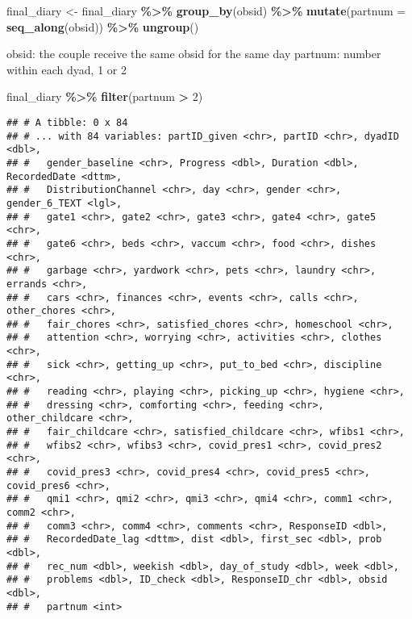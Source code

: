 \documentclass[
]{article}
\newenvironment{Shaded}{\begin{snugshade}}{\end{snugshade}}
\newcommand{\DataTypeTok}[1]{\textcolor[rgb]{0.13,0.29,0.53}{#1}}
\newcommand{\DecValTok}[1]{\textcolor[rgb]{0.00,0.00,0.81}{#1}}
\newcommand{\KeywordTok}[1]{\textcolor[rgb]{0.13,0.29,0.53}{\textbf{#1}}}
\newcommand{\NormalTok}[1]{#1}
\newcommand{\OperatorTok}[1]{\textcolor[rgb]{0.81,0.36,0.00}{\textbf{#1}}}
\newcommand{\StringTok}[1]{\textcolor[rgb]{0.31,0.60,0.02}{#1}}
\begin{document}
\begin{Shaded}
\begin{Highlighting}[]
\NormalTok{final\_diary \textless{}{-}}\StringTok{ }\NormalTok{final\_diary }\OperatorTok{\%\textgreater{}\%}
\StringTok{  }\KeywordTok{group\_by}\NormalTok{(obsid) }\OperatorTok{\%\textgreater{}\%}
\StringTok{  }\KeywordTok{mutate}\NormalTok{(}\DataTypeTok{partnum =} \KeywordTok{seq\_along}\NormalTok{(obsid)) }\OperatorTok{\%\textgreater{}\%}
\StringTok{  }\KeywordTok{ungroup}\NormalTok{()}
\end{Highlighting}
\end{Shaded}

obsid: the couple receive the same obsid for the same day partnum:
number within each dyad, 1 or 2

\begin{Shaded}
\begin{Highlighting}[]
\NormalTok{final\_diary }\OperatorTok{\%\textgreater{}\%}
\StringTok{  }\KeywordTok{filter}\NormalTok{(partnum }\OperatorTok{\textgreater{}}\StringTok{ }\DecValTok{2}\NormalTok{)}
\end{Highlighting}
\end{Shaded}

\begin{verbatim}
## # A tibble: 0 x 84
## # ... with 84 variables: partID_given <chr>, partID <chr>, dyadID <dbl>,
## #   gender_baseline <chr>, Progress <dbl>, Duration <dbl>, RecordedDate <dttm>,
## #   DistributionChannel <chr>, day <chr>, gender <chr>, gender_6_TEXT <lgl>,
## #   gate1 <chr>, gate2 <chr>, gate3 <chr>, gate4 <chr>, gate5 <chr>,
## #   gate6 <chr>, beds <chr>, vaccum <chr>, food <chr>, dishes <chr>,
## #   garbage <chr>, yardwork <chr>, pets <chr>, laundry <chr>, errands <chr>,
## #   cars <chr>, finances <chr>, events <chr>, calls <chr>, other_chores <chr>,
## #   fair_chores <chr>, satisfied_chores <chr>, homeschool <chr>,
## #   attention <chr>, worrying <chr>, activities <chr>, clothes <chr>,
## #   sick <chr>, getting_up <chr>, put_to_bed <chr>, discipline <chr>,
## #   reading <chr>, playing <chr>, picking_up <chr>, hygiene <chr>,
## #   dressing <chr>, comforting <chr>, feeding <chr>, other_childcare <chr>,
## #   fair_childcare <chr>, satisfied_childcare <chr>, wfibs1 <chr>,
## #   wfibs2 <chr>, wfibs3 <chr>, covid_pres1 <chr>, covid_pres2 <chr>,
## #   covid_pres3 <chr>, covid_pres4 <chr>, covid_pres5 <chr>, covid_pres6 <chr>,
## #   qmi1 <chr>, qmi2 <chr>, qmi3 <chr>, qmi4 <chr>, comm1 <chr>, comm2 <chr>,
## #   comm3 <chr>, comm4 <chr>, comments <chr>, ResponseID <dbl>,
## #   RecordedDate_lag <dttm>, dist <dbl>, first_sec <dbl>, prob <dbl>,
## #   rec_num <dbl>, weekish <dbl>, day_of_study <dbl>, week <dbl>,
## #   problems <dbl>, ID_check <dbl>, ResponseID_chr <dbl>, obsid <dbl>,
## #   partnum <int>
\end{verbatim}
\end{document}

